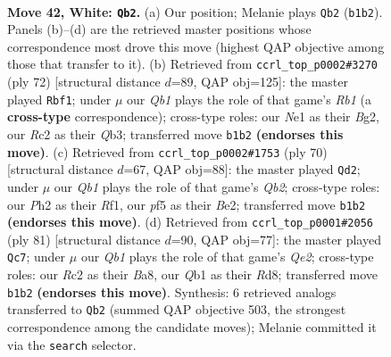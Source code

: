 \documentclass[11pt]{article}
\begin{document}
\clearpage

\begin{figure}[p]\centering
\begin{subfigure}{0.46\textwidth}\centering
\resizebox{\linewidth}{!}{%
\newchessgame
\chessboard[
  setfen={n1rb2k1/1q4n1/p4r2/P1p2p1p/3p1Pp1/1P4P1/2RBP2P/RQ1NN1K1 w - - 0 42},
  showmover=false,
  pgfstyle=straightmove, color=movearrow, markmove={b1-b2}
]}
\caption{}
\end{subfigure}\hfill
\begin{subfigure}{0.46\textwidth}\centering
\resizebox{\linewidth}{!}{%
\newchessgame
\chessboard[
  setfen={rrb5/2q2nkp/1p1p1pp1/3Pp3/P1P1P1P1/1Q5P/2N2RB1/1R4K1 w - - 9 37},
  showmover=false,
  pgfstyle=straightmove, color=movearrow, markmove={b1-f1}
]}
\caption{}
\end{subfigure}
\\[4pt]
\begin{subfigure}{0.46\textwidth}\centering
\resizebox{\linewidth}{!}{%
\newchessgame
\chessboard[
  setfen={3r1k2/1pr2bp1/pqnppp1p/8/P1P1PP2/1PNR3P/1Q2B1PK/5R2 w - - 1 36},
  showmover=false,
  pgfstyle=straightmove, color=movearrow, markmove={b2-d2}
]}
\caption{}
\end{subfigure}\hfill
\begin{subfigure}{0.46\textwidth}\centering
\resizebox{\linewidth}{!}{%
\newchessgame
\chessboard[
  setfen={b2r2k1/4q1p1/1p1pprn1/6b1/PpP4p/1P3P1P/2Q1N1PB/R2R1B1K b - - 3 41},
  showmover=false,
  pgfstyle=straightmove, color=movearrow, markmove={e7-c7}
]}
\caption{}
\end{subfigure}
\caption{\textbf{Move 42, White: \texttt{Qb2}.} (a) Our position; Melanie plays \texttt{Qb2} (\texttt{b1b2}). Panels (b)--(d) are the retrieved master positions whose correspondence most drove this move (highest QAP objective among those that transfer to it). (b) Retrieved from \texttt{ccrl\_top\_p0002\#3270} (ply 72) [structural distance $d$=89, QAP obj=125]: the master played \texttt{Rbf1}; under $\mu$ our \emph{Qb1} plays the role of that game's \emph{Rb1} (a \textbf{cross-type} correspondence); cross-type roles: our \emph{N}e1 as their \emph{B}g2, our \emph{R}c2 as their \emph{Q}b3; transferred move \texttt{b1b2} \textbf{(endorses this move)}. (c) Retrieved from \texttt{ccrl\_top\_p0002\#1753} (ply 70) [structural distance $d$=67, QAP obj=88]: the master played \texttt{Qd2}; under $\mu$ our \emph{Qb1} plays the role of that game's \emph{Qb2}; cross-type roles: our \emph{P}h2 as their \emph{R}f1, our \emph{p}f5 as their \emph{B}e2; transferred move \texttt{b1b2} \textbf{(endorses this move)}. (d) Retrieved from \texttt{ccrl\_top\_p0001\#2056} (ply 81) [structural distance $d$=90, QAP obj=77]: the master played \texttt{Qc7}; under $\mu$ our \emph{Qb1} plays the role of that game's \emph{Qe2}; cross-type roles: our \emph{R}c2 as their \emph{B}a8, our \emph{Q}b1 as their \emph{R}d8; transferred move \texttt{b1b2} \textbf{(endorses this move)}. Synthesis: 6 retrieved analogs transferred to \texttt{Qb2} (summed QAP objective 503, the strongest correspondence among the candidate moves); Melanie committed it via the \texttt{search} selector.}
\label{fig:thought-m82}
\end{figure}
\end{document}
